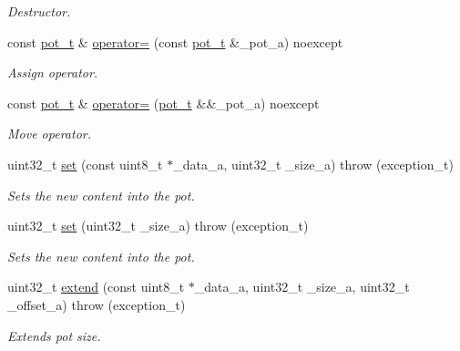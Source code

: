 \begin{DoxyCompactItemize}
\begin{DoxyCompactList}\small\item\em Destructor. \end{DoxyCompactList}\item 
const \hyperlink{class_n_h_1_1_protocols_1_1_raw_1_1pot__t}{pot\+\_\+t} \& \hyperlink{class_n_h_1_1_protocols_1_1_raw_1_1pot__t_a65d782c7d72c93a090f3ae24215fb1bb}{operator=} (const \hyperlink{class_n_h_1_1_protocols_1_1_raw_1_1pot__t}{pot\+\_\+t} \&\+\_\+pot\+\_\+a) noexcept
\begin{DoxyCompactList}\small\item\em Assign operator. \end{DoxyCompactList}\item 
const \hyperlink{class_n_h_1_1_protocols_1_1_raw_1_1pot__t}{pot\+\_\+t} \& \hyperlink{class_n_h_1_1_protocols_1_1_raw_1_1pot__t_a17dfa779637feb4361afd41379ee29a4}{operator=} (\hyperlink{class_n_h_1_1_protocols_1_1_raw_1_1pot__t}{pot\+\_\+t} \&\&\+\_\+pot\+\_\+a) noexcept
\begin{DoxyCompactList}\small\item\em Move operator. \end{DoxyCompactList}\item 
uint32\+\_\+t \hyperlink{class_n_h_1_1_protocols_1_1_raw_1_1pot__t_a40bf65465fc5c89912115c60202f8cbb}{set} (const uint8\+\_\+t $\ast$\+\_\+data\+\_\+a, uint32\+\_\+t \+\_\+size\+\_\+a)  throw (exception\+\_\+t)
\begin{DoxyCompactList}\small\item\em Sets the new content into the pot. \end{DoxyCompactList}\item 
uint32\+\_\+t \hyperlink{class_n_h_1_1_protocols_1_1_raw_1_1pot__t_af4d6f1f0181d26d78e4e5d3a7394170b}{set} (uint32\+\_\+t \+\_\+size\+\_\+a)  throw (exception\+\_\+t)
\begin{DoxyCompactList}\small\item\em Sets the new content into the pot. \end{DoxyCompactList}\item 
uint32\+\_\+t \hyperlink{class_n_h_1_1_protocols_1_1_raw_1_1pot__t_a5172b32c32881377431f0f05eac07615}{extend} (const uint8\+\_\+t $\ast$\+\_\+data\+\_\+a, uint32\+\_\+t \+\_\+size\+\_\+a, uint32\+\_\+t \+\_\+offset\+\_\+a)  throw (exception\+\_\+t)
\begin{DoxyCompactList}\small\item\em Extends pot size. \end{DoxyCompactList}\item 

\end{DoxyCompactItemize}
